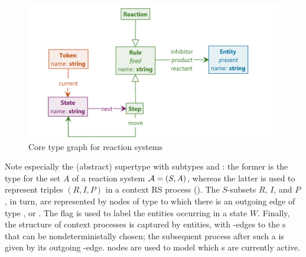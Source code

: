 \begin{figure}
\centering
\includegraphics[scale=.2]{figs/core-type}
\caption{Core type graph for reaction systems}
\label{fig:core-type}
\end{figure}
%
Note especially the (abstract) supertype \Rule with subtypes \Reaction and \Step: the former is the type for the set $A$ of a reaction system ${\cal A}=(S,A)$, whereas the latter is used to represent triples $(R,I,P)$ in a context RS process (). The $S$-subsets $R$, $I$, and $P$, in turn, are represented by nodes of type \Entity to which there is an outgoing edge of type \reactant, \inhibitor or \product. The flag \present is used to label the entities occurring in a state $W$. Finally, the structure of context processes is captured by \State entities, with \nextt-edges to the \Step{}s that can be nondeterministally chosen; the subsequent process after such a \Step is given by its outgoing \move-edge. \Token nodes are used to model which \State{}s are currently active.

